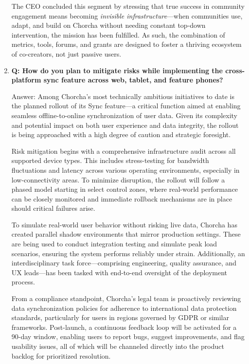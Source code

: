 \documentclass[12pt,a4paper,oneside]{book}
\begin{document}
\begin{enumerate}
The CEO concluded this segment by stressing that true success in community engagement means becoming \emph{invisible infrastructure}—when communities use, adapt, and build on Chorcha without needing constant top-down intervention, the mission has been fulfilled. As such, the combination of metrics, tools, forums, and grants are designed to foster a thriving ecosystem of co-creators, not just passive users.


\item \textbf{Q: How do you plan to mitigate risks while implementing the cross-platform sync feature across web, tablet, and feature phones?}

Answer: Among Chorcha’s most technically ambitious initiatives to date is the planned rollout of its Sync feature—a critical function aimed at enabling seamless offline-to-online synchronization of user data. Given its complexity and potential impact on both user experience and data integrity, the rollout is being approached with a high degree of caution and strategic foresight.

Risk mitigation begins with a comprehensive infrastructure audit across all supported device types. This includes stress-testing for bandwidth fluctuations and latency across various operating environments, especially in low-connectivity areas. To minimize disruption, the rollout will follow a phased model starting in select control zones, where real-world performance can be closely monitored and immediate rollback mechanisms are in place should critical failures arise.

To simulate real-world user behavior without risking live data, Chorcha has created parallel shadow environments that mirror production settings. These are being used to conduct integration testing and simulate peak load scenarios, ensuring the system performs reliably under strain. Additionally, an interdisciplinary task force—comprising engineering, quality assurance, and UX leads—has been tasked with end-to-end oversight of the deployment process.

From a compliance standpoint, Chorcha’s legal team is proactively reviewing data synchronization policies for adherence to international data protection standards, particularly for users in regions governed by GDPR or similar frameworks. Post-launch, a continuous feedback loop will be activated for a 90-day window, enabling users to report bugs, suggest improvements, and flag usability issues, all of which will be channeled directly into the product backlog for prioritized resolution.
\end{enumerate}
\end{document}
